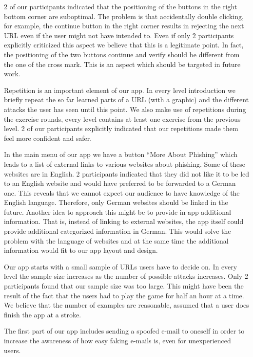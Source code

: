 \begin{description}[leftmargin=0cm]
2 of our participants indicated that the positioning of the buttons in the right bottom corner are suboptimal.
The problem is that accidentally double clicking, for example, the continue button in the right corner results in rejecting the next URL even if the user might not have intended to.
Even if only 2 participants explicitly criticized this aspect we believe that this is a legitimate point.
In fact, the positioning of the two buttons continue and verify should be different from the one of the cross mark.
This is an aspect which should be targeted in future work. 
	\item[Repetition:]
Repetition is an important element of our app.
In every level introduction we briefly repeat the so far learned parts of a URL (with a graphic) and the different attacks the user has seen until this point.
We also make use of repetitions during the exercise rounds, every level contains at least one exercise from the previous level.
2 of our participants explicitly indicated that our repetitions made them feel more confident and safer.
	\item[External Links:]
In the main menu of our app we have a button ``More About Phishing'' which leads to a list of external links to various websites about phishing.
Some of these websites are in English.
2 participants indicated that they did not like it to be led to an English website and would have preferred to be forwarded to a German one.
This reveals that we cannot expect our audience to have knowledge of the English language.
Therefore, only German websites should be linked in the future.
Another idea to approach this might be to provide in-app additional information.
That is, instead of linking to external websites, the app itself could provide additional categorized information in German.
This would solve the problem with the language of websites and at the same time the additional information would fit to our app layout and design.
	\item[Amount of Examples:] Our app starts with a small sample of URLs users have to decide on.
In every level the sample size increases as the number of possible attacks increases.
Only 2 participants found that our sample size was too large.
This might have been the result of the fact that the users had to play the game for half an hour at a time.
We believe that the number of examples are reasonable, assumed that a user does finish the app at a stroke.
	\item[E-Mail Not Received:] The first part of our app includes sending a spoofed e-mail to oneself in order to increase the awareness of how easy faking e-mails is, even for unexperienced users.

\end{description}
